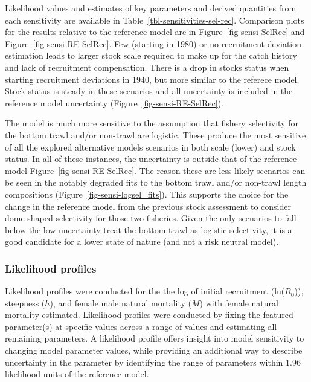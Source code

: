 \documentclass[
]{scrartcl}
\begin{document}
Likelihood values and estimates of key parameters and derived quantities
from each sensitivity are available in
Table~\ref{tbl-sensitivities-sel-rec}. Comparison plots for the results
relative to the reference model are in Figure~\ref{fig-sensi-SelRec} and
Figure~\ref{fig-sensi-RE-SelRec}. Few (starting in 1980) or no
recruitment deviation estimation leads to larger stock scale required to
make up for the catch history and lack of recruitment compensation.
There is a drop in stocks status when starting recruitment deviations in
1940, but more similar to the referece model. Stock status is steady in
these scenarios and all uncertainty is included in the reference model
uncertainty (Figure~\ref{fig-sensi-RE-SelRec}).

The model is much more sensitive to the assumption that fishery
selectivity for the bottom trawl and/or non-trawl are logistic. These
produce the most sensitive of all the explored alternative models
scenarios in both scale (lower) and stock status. In all of these
instances, the uncertainty is outside that of the reference model
Figure~\ref{fig-sensi-RE-SelRec}. The reason these are less likely
scenarios can be seen in the notably degraded fits to the bottom trawl
and/or non-trawl length compositions
(Figure~\ref{fig-sensi-logsel_fits}). This supports the choice for the
change in the reference model from the previous stock assessment to
consider dome-shaped selectivity for those two fisheries. Given the only
scenarios to fall below the low uncertainty treat the bottom trawl as
logistic selectivity, it is a good candidate for a lower state of nature
(and not a risk neutral model).

\subsubsection{Likelihood profiles}\label{sec-profiles}

Likelihood profiles were conducted for the the log of initial
recruitment (ln(\(R_0\))), steepness (\(h\)), and female male natural
mortality (\(M\)) with female natural mortality estimated. Likelihood
profiles were conducted by fixing the featured parameter(s) at specific
values across a range of values and estimating all remaining parameters.
A likelihood profile offers insight into model sensitivity to changing
model parameter values, while providing an additional way to describe
uncertainty in the parameter by identifying the range of parameters
within 1.96 likelihood units of the reference model.
\end{document}
